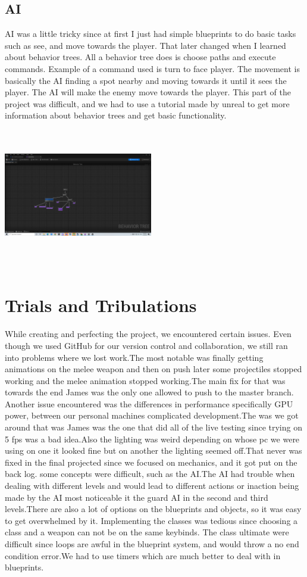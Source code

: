 \documentclass{sigchi}
\begin{document}
\subsection{AI}
AI was a little tricky since at first I just had simple blueprints to do basic tasks such as see, and move towards the player. That later changed when I learned about behavior trees. All a behavior tree does is choose paths and execute commands. Example of a command used is turn to face player. The movement is basically the AI finding a spot nearby and moving towards it until it sees the player. The AI will make the enemy move towards the player. This part of the project was difficult, and we had to use a tutorial made by unreal to get more information about behavior trees and get basic functionality. 
\includegraphics[width=6.5cm, height=6.5cm]{Figure/AI.png}  

\section{Trials and Tribulations}
While creating and perfecting the project, we encountered certain issues. Even though we used GitHub for our version control and collaboration, we still ran into problems where we lost work.The most notable was finally  getting animations on the melee weapon and then on push later some projectiles stopped working and the melee animation stopped working.The main fix for that was towards the end James was the only one allowed to push to the master branch.   Another issue encountered was the differences in performance specifically GPU power, between our personal machines complicated development.The was we got around that was James was the one that did all of the live testing since trying on 5 fps was a bad idea.Also the lighting was weird depending on whose pc we were using on one it looked fine but on another the lighting seemed off.That never was fixed in the final projected since we focused on mechanics, and it got put on the back log. some concepts were difficult, such as the AI.The AI had trouble when dealing with different levels and would lead to different actions or inaction being made by the AI most noticeable it the guard AI in the second and third levels.There are also a lot of options on the blueprints and objects, so it was easy to get overwhelmed by it. Implementing the classes was tedious since choosing a class and a weapon can not be on the same keybinds. The class ultimate were difficult since loops are awful in the blueprint system, and would throw a no end condition error.We had to use timers which are much better to deal with in blueprints.
\end{document}
